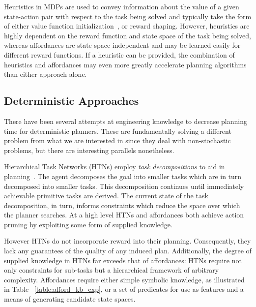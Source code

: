 \documentclass[letterpaper]{article}
\begin{document}

Heuristics in MDPs are used to convey information about the value of a
given state-action pair with respect to the task being solved and
typically take the form of either value function
initialization~\citep{Hansen:1999qf}, or reward shaping\cite{potshap}.
However, heuristics are highly dependent on the reward function and
state space of the task being solved, whereas affordances are state
space independent and may be learned easily for different reward
functions. If a heuristic can be provided, the combination of
heuristics and affordances may even more greatly accelerate planning
algorithms than either approach alone.

\subsection{Deterministic Approaches}

There have been several attempts at engineering knowledge
to decrease planning time for deterministic planners. These are
fundamentally solving a different problem from what we are interested
in since they deal with non-stochastic problems, but there are
interesting parallels nonetheless.


Hierarchical Task Networks (HTNs) employ \textit{task decompositions}
to aid in planning~\cite{erol1994htn}. The agent decomposes the goal
into smaller tasks which are in turn decomposed into smaller
tasks. This decomposition continues until immediately achievable
primitive tasks are derived. The current state of the task
decomposition, in turn, informs constraints which reduce the space
over which the planner searches. At a high level HTNs and affordances
both achieve action pruning by exploiting some form of supplied
knowledge.

However HTNs do not incorporate reward into their
planning. Consequently, they lack any guarantees of the quality of any
induced plan.  Additionally, the degree of supplied knowledge in HTNs
far exceeds that of affordances: HTNs require not only constraints for
sub-tasks but a hierarchical framework of arbitrary
complexity. Affordances require either simple symbolic knowledge, as
illustrated in Table ~\ref{table:afford_kb_exp}, or a set of
predicates for use as features and a means of generating candidate
state spaces.

\end{document}
